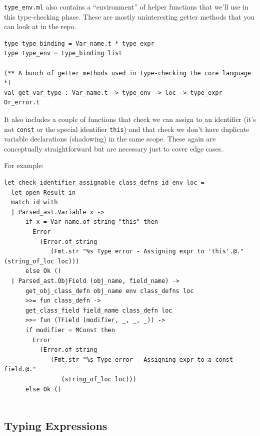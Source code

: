 {{\texttt{type\_env.ml} also contains a ``environment'' of helper
functions that we'll use in this type-checking phase. These are mostly
uninteresting getter methods that you can look at in the repo.

%
\begin{lstlisting}[language=caml,caption={type\_env.mli}]
type type_binding = Var_name.t * type_expr
type type_env = type_binding list

(** A bunch of getter methods used in type-checking the core language *)
val get_var_type : Var_name.t -> type_env -> loc -> type_expr Or_error.t
\end{lstlisting}

It also includes a couple of functions that check we can assign to an
identifier (it's not \texttt{const} or the special identifier
\texttt{this}) and that check we don't have duplicate variable
declarations (shadowing) in the same scope. These again are conceptually
straightforward but are necessary just to cover edge cases.

For example:

\begin{lstlisting}[language=caml,caption={type\_env.ml}]
let check_identifier_assignable class_defns id env loc =
  let open Result in
  match id with
  | Parsed_ast.Variable x ->
      if x = Var_name.of_string "this" then
        Error
          (Error.of_string
             (Fmt.str "%s Type error - Assigning expr to 'this'.@." (string_of_loc loc)))
      else Ok ()
  | Parsed_ast.ObjField (obj_name, field_name) ->
      get_obj_class_defn obj_name env class_defns loc
      >>= fun class_defn ->
      get_class_field field_name class_defn loc
      >>= fun (TField (modifier, _, _, _)) ->
      if modifier = MConst then
        Error
          (Error.of_string
             (Fmt.str "%s Type error - Assigning expr to a const field.@."
                (string_of_loc loc)))
      else Ok ()


\end{lstlisting}

\hypertarget{typing-expressions}{%
\subsection{\texorpdfstring{\protect\hyperlink{typing-expressions}{}Typing
Expressions}{Typing Expressions}}\label{typing-expressions}}

}}
